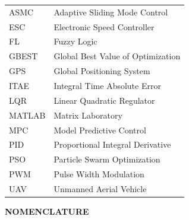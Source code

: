 \documentclass[12pt,a4paper]{report}
\begin{document}
\setlength{\tabcolsep}{3pt} %

\begin{longtable}{p{2.5cm} p{10cm}}  %

ASMC   & Adaptive Sliding Mode Control \\
ESC    & Electronic Speed Controller \\
FL     & Fuzzy Logic \\
GBEST  & Global Best Value of Optimization \\
GPS    & Global Positioning System \\
ITAE   & Integral Time Absolute Error \\
LQR    & Linear Quadratic Regulator \\
MATLAB & Matrix Laboratory \\
MPC    & Model Predictive Control \\
PID    & Proportional Integral Derivative \\
PSO    & Particle Swarm Optimization \\
PWM    & Pulse Width Modulation \\
UAV    & Unmanned Aerial Vehicle \\

\end{longtable}





     \newpage
\begin{center}
    \Large\bfseries NOMENCLATURE
\end{center}
\end{document}
